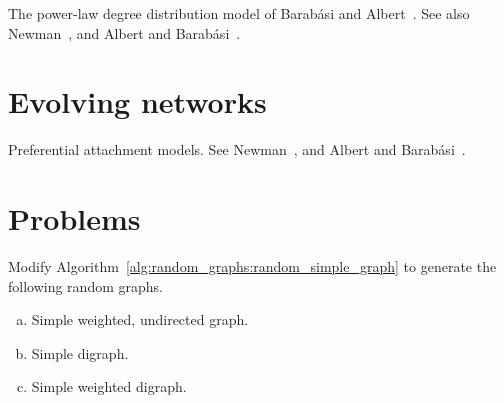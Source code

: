 The power-law degree distribution model of Barab{\'a}si and
Albert~\cite{BarabasiAlbert1999}. See also Newman~\cite{Newman2003},
and Albert and Barab{\'a}si~\cite{AlbertBarabasi2002}.



\section{Evolving networks}

Preferential attachment models. See Newman~\cite{Newman2003},
and Albert and Barab{\'a}si~\cite{AlbertBarabasi2002}.



\section{Problems}

\begin{problem}
\item Modify Algorithm~\ref{alg:random_graphs:random_simple_graph} to
  generate the following random graphs.
  \begin{enumerate}[(a)]
  \item Simple weighted, undirected graph.

  \item Simple digraph.

  \item Simple weighted digraph.
  \end{enumerate}
\end{problem}
